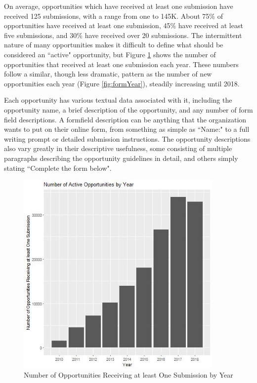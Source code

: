 \documentclass[]{report}   %
\begin{document}
\FloatBarrier
On average, opportunities which have received at least one submission have received 125 submissions, with a range from one to 145K. About 75\% of opportunities have received at least one submission, 45\% have received at least five submissions, and 30\% have received over 20 submissions. The intermittent nature of many opportunities makes it difficult to define what should be considered an ``active" opportunity, but Figure \ref{fig:activeForms} shows the number of opportunities that received at least one submission each year. These numbers follow a similar, though less dramatic, pattern as the number of new opportunities each year (Figure \ref{fig:formYear}), steadily increasing until 2018.

Each opportunity has various textual data associated with it, including the opportunity name, a brief description of the opportunity, and any number of form field descriptions. A formfield description can be anything that the organization wants to put on their online form, from something as simple as ``Name:" to a full writing prompt or detailed submission instructions. The opportunity descriptions also vary greatly in their descriptive usefulness, some consisting of multiple paragraphs describing the opportunity guidelines in detail, and others simply stating ``Complete the form below". 

\begin{figure}[h]
    \centering
    \begin{minipage}{0.45\textwidth}
        \centering
        \includegraphics[width=0.9\textwidth]{activeForms_plot.jpg} %
        \caption{Number of Opportunities Receiving at least One Submission by Year}
	  \label{fig:activeForms}
    \end{minipage}\hfill
\end{figure}
\FloatBarrier
\end{document}
